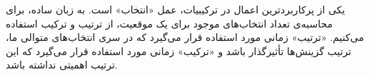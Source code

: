 \p
یکی از پرکاربردترین اعمال در ترکیبیات، عمل «انتخاب» است.
به زبان ساده، برای محاسبه‌ی تعداد انتخاب‌های موجود برای یک موقعیت، از ترتیب و ترکیب استفاده می‌کنیم.
«ترتیب» زمانی مورد استفاده قرار می‌گیرد که در سری انتخاب‌های متوالی ما، ترتیب گزینش‌ها تأثیرگذار باشد
و «ترکیب» زمانی مورد استفاده قرار می‌گیرد که این ترتیب اهمیتی نداشته باشد.





